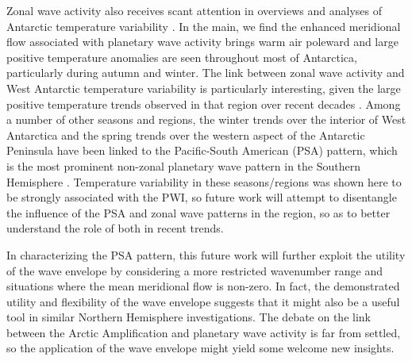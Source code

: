 Zonal wave activity also receives scant attention in overviews and analyses of Antarctic temperature variability \citep[e.g.][]{Russell2010,SchneiderOkumura2012,Yu2012}. In the main, we find the enhanced meridional flow associated with planetary wave activity brings warm air poleward and large positive temperature anomalies are seen throughout most of Antarctica, particularly during autumn and winter. The link between zonal wave activity and West Antarctic temperature variability is particularly interesting, given the large positive temperature trends observed in that region over recent decades \citep[e.g.][]{Bromwich2013}. Among a number of other seasons and regions, the winter trends over the interior of West Antarctica \citep{Ding2011} and the spring trends over the western aspect of the Antarctic Peninsula \citep{Ding2013} have been linked to the Pacific-South American (PSA) pattern, which is the most prominent non-zonal planetary wave pattern in the Southern Hemisphere \citep[e.g.][]{Mo2001}. Temperature variability in these seasons/regions was shown here to be strongly associated with the PWI, so future work will attempt to disentangle the influence of the PSA and zonal wave patterns in the region, so as to better understand the role of both in recent trends.    

In characterizing the PSA pattern, this future work will further exploit the utility of the wave envelope by considering a more restricted wavenumber range and situations where the mean meridional flow is non-zero. In fact, the demonstrated utility and flexibility of the wave envelope suggests that it might also be a useful tool in similar Northern Hemisphere investigations. The debate on the link between the Arctic Amplification and planetary wave activity is far from settled, so the application of the wave envelope might yield some welcome new insights.    
